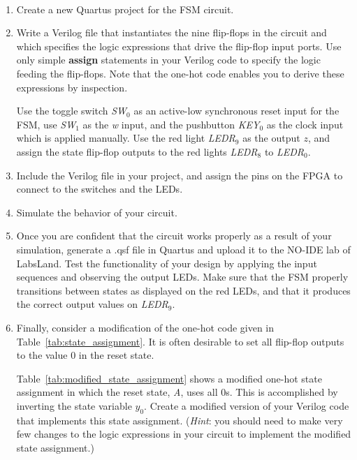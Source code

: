 \documentclass[epsfig,10pt,fullpage]{article}
\begin{document}
\begin{enumerate}
\item Create a new Quartus\textsuperscript{\textregistered} project for the FSM circuit. 

\item Write a Verilog file that instantiates the nine flip-flops in the circuit and which
specifies the logic expressions that drive the flip-flop input ports. Use only
simple {\bf assign} statements in your Verilog code to specify the logic feeding the
flip-flops. Note that the one-hot code enables you to derive these expressions by
inspection.

Use the toggle switch {\it SW}$_0$ as an active-low synchronous reset input
for the FSM, use {\it SW}$_1$ as the {\it w} input, and the pushbutton {\it KEY}$_0$ as the clock input which 
is applied manually.  Use the red light {\it LEDR}$_9$ as the output $z$, 
and assign the state flip-flop outputs to the red lights {\it LEDR}$_8$ to {\it LEDR}$_0$.

\item Include the Verilog file in your project, and assign the pins on the FPGA to 
connect to the switches and the LEDs.

\item Simulate the behavior of your circuit.

\item Once you are confident that the circuit works properly as a result of your
simulation, generate a .qsf file in Quartus and upload it to the NO-IDE lab of LabsLand.  Test the functionality of your 
design by applying the input sequences and observing the output LEDs. Make sure that the
FSM properly transitions between states as displayed on the red LEDs, and that it produces
the correct output values on {\it LEDR}$_9$.

\item Finally, consider a modification of the one-hot code given in Table~\ref{tab:state_assignment}. It is often 
desirable to set all flip-flop outputs to the value 0 in the reset state.

Table~\ref{tab:modified_state_assignment} shows a modified one-hot state assignment in which the reset state, {\it A},
uses all 0s. This is accomplished by inverting the state variable $y_0$. 
Create a modified version of your Verilog code that implements this state
assignment. ({\it Hint}: you should need to make very few changes to the logic expressions
in your circuit to implement the modified state assignment.) 


\end{enumerate}
\end{document}
